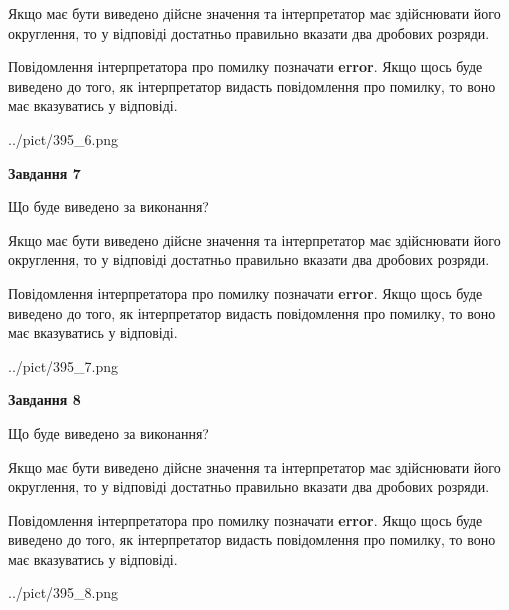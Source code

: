 \documentclass[12pt, ukrainian]{article}
\begin{document}
{\begin {Large}
Якщо має бути виведено дійсне значення та інтерпретатор має здійснювати його округлення, 
то у відповіді достатньо правильно вказати два дробових розряди.

Повідомлення інтерпретатора про помилку позначати \textbf{error}.
Якщо щось буде виведено до того, як інтерпретатор видасть повідомлення про помилку, 
то воно має вказуватись у відповіді. \par

\begin{center}
	{../pict/395_6.png}
\end{center}
\newpage

{\begin {center}\textbf{Завдання 7}\end {center}}\par
Що буде виведено за виконання? \par

Якщо має бути виведено дійсне значення та інтерпретатор має здійснювати його округлення, 
то у відповіді достатньо правильно вказати два дробових розряди.

Повідомлення інтерпретатора про помилку позначати \textbf{error}.
Якщо щось буде виведено до того, як інтерпретатор видасть повідомлення про помилку, 
то воно має вказуватись у відповіді. \par

\begin{center}
	{../pict/395_7.png}
\end{center}
\newpage

{\begin {center}\textbf{Завдання 8}\end {center}}\par
Що буде виведено за виконання? \par

Якщо має бути виведено дійсне значення та інтерпретатор має здійснювати його округлення, 
то у відповіді достатньо правильно вказати два дробових розряди.

Повідомлення інтерпретатора про помилку позначати \textbf{error}.
Якщо щось буде виведено до того, як інтерпретатор видасть повідомлення про помилку, 
то воно має вказуватись у відповіді. \par

\begin{center}
	{../pict/395_8.png}
\end{center}
\newpage


\end{Large}}
\end{document}
